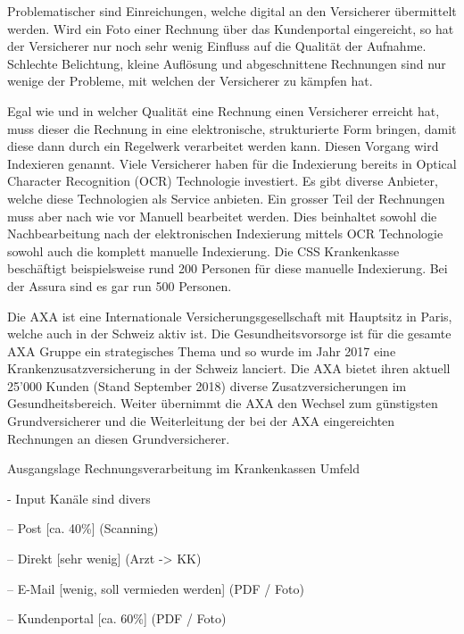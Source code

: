 \documentclass[12pt]{extarticle}
\begin{document}
Problematischer sind Einreichungen, welche digital an den Versicherer übermittelt werden. Wird ein Foto einer Rechnung über das Kundenportal eingereicht, so hat der Versicherer nur noch sehr wenig Einfluss auf die Qualität der Aufnahme. Schlechte Belichtung, kleine Auflösung und abgeschnittene Rechnungen sind nur wenige der Probleme, mit welchen der Versicherer zu kämpfen hat.

Egal wie und in welcher Qualität eine Rechnung einen Versicherer erreicht hat, muss dieser die Rechnung in eine elektronische, strukturierte Form bringen, damit diese dann durch ein Regelwerk verarbeitet werden kann. Diesen Vorgang wird Indexieren genannt. Viele Versicherer haben für die Indexierung bereits in Optical Character Recognition (OCR) Technologie investiert. Es gibt diverse Anbieter, welche diese Technologien als Service anbieten. Ein grosser Teil der Rechnungen muss aber nach wie vor Manuell bearbeitet werden. Dies beinhaltet sowohl die Nachbearbeitung nach der elektronischen Indexierung mittels OCR Technologie sowohl auch die komplett manuelle Indexierung. Die CSS Krankenkasse beschäftigt beispielsweise rund 200 Personen für diese manuelle Indexierung. Bei der Assura sind es gar run 500 Personen.

Die AXA ist eine Internationale Versicherungsgesellschaft mit Hauptsitz in Paris, welche auch in der Schweiz aktiv ist. Die Gesundheitsvorsorge ist für die gesamte AXA Gruppe ein strategisches Thema und so wurde im Jahr 2017 eine Krankenzusatzversicherung in der Schweiz lanciert. Die AXA bietet ihren aktuell 25'000 Kunden (Stand September 2018) diverse Zusatzversicherungen im Gesundheitsbereich. Weiter übernimmt die AXA den Wechsel zum günstigsten Grundversicherer und die Weiterleitung der bei der AXA eingereichten Rechnungen an diesen Grundversicherer.






\vspace{200pt}

Ausgangslage Rechnungsverarbeitung im Krankenkassen Umfeld

- Input Kanäle sind divers

  -- Post [ca. 40\%] (Scanning)
  
  -- Direkt [sehr wenig] (Arzt -> KK)
  
  -- E-Mail [wenig, soll vermieden werden] (PDF / Foto)
  
  -- Kundenportal [ca. 60\%] (PDF / Foto)
\end{document}
